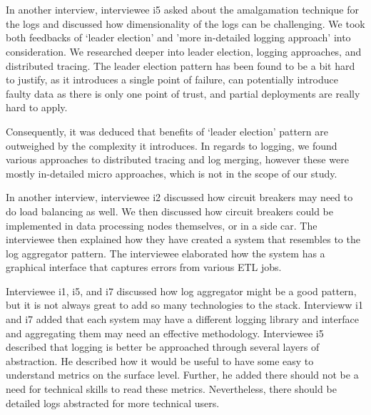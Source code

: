 \documentclass{bmcart}
\begin{document}
\,

\setlength{\fboxsep}{0.7em}
\noindent{}

\,

In another interview, interviewee i5 asked about the amalgamation technique for the logs and discussed how dimensionality of the logs can be challenging. We took both feedbacks of `leader election' and 'more in-detailed logging approach' into consideration. We researched deeper into leader election, logging approaches, and distributed tracing. The leader election pattern has been found to be a bit hard to justify, as it introduces a single point of failure, can potentially introduce faulty data as there is only one point of trust, and partial deployments are really hard to apply. 

Consequently, it was deduced that benefits of `leader election' pattern are outweighed by the complexity it introduces. In regards to logging, we found various approaches to distributed tracing and log merging, however these were mostly in-detailed micro approaches, which is not in the scope of our study. 

In another interview, interviewee i2 discussed how circuit breakers may need to do load balancing as well. We then discussed how circuit breakers could be implemented in data processing nodes themselves, or in a side car. The interviewee then explained how they have created a system that resembles to the log aggregator pattern. The interviewee elaborated how the system has a graphical interface that captures errors from various ETL jobs. 

Interviewee i1, i5, and i7 discussed how log aggregator might be a good pattern, but it is not always great to add so many technologies to the stack. Intervieww i1 and i7 added that each system may have a different logging library and interface and aggregating them may need an effective methodology. Interviewee i5 described that logging is better be approached through several layers of abstraction. He described how it would be useful to have some easy to understand metrics on the surface level. Further, he added there should not be a need for technical skills to read these metrics. Nevertheless, there should be detailed logs abstracted for more technical users.

\,

\setlength{\fboxsep}{0.7em}
\noindent{}
\end{document}
